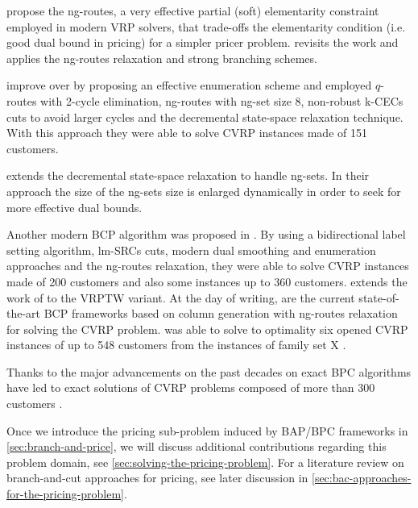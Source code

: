 \textcite{baldacci2011} propose the ng-routes, a very effective
partial (soft) elementarity constraint employed in modern VRP solvers,
that trade-offs the elementarity condition (i.e. good dual bound in pricing)
for a simpler pricer problem.
\textcite{ropke2012} revisits the work \citeauthor{fukasawa2006} and applies
the ng-routes relaxation and strong branching schemes.

\textcite{contardo2014} improve over \textcite{contardo2011}
by proposing an effective enumeration scheme and employed
$q$-routes with 2-cycle elimination, ng-routes with ng-set size 8,
non-robust k-CECs cuts to avoid larger cycles
and the decremental state-space relaxation technique.
With this approach they were able to solve CVRP instances made of 151 customers.

\textcite{martinelli2014} extends the decremental state-space relaxation
to handle ng-sets.
In their approach the size of the ng-sets size
is enlarged dynamically in order to seek for more effective dual bounds.

Another modern BCP algorithm was proposed in \textcite{pecin2017improved}.
By using a bidirectional label setting algorithm,
lm-SRCs cuts, modern dual smoothing and enumeration approaches
and the ng-routes relaxation, they were able to solve CVRP instances made of 200 customers
and also some instances up to 360 customers.
\textcite{pecin2017new} extends the work of \textcite{pecin2017improved} to the VRPTW variant.
At the day of writing, \textcite{pessoa2018enhanced, pessoa2020generic} are the current state-of-the-art
BCP frameworks based on column generation with ng-routes relaxation
for solving the CVRP problem.
\textcite{pessoa2020generic} was able to solve to optimality six opened
CVRP instances of up to 548 customers from the instances of family set X \parencite{uchoa2017}.

Thanks to the major advancements on the past decades
on exact BPC algorithms
have led to exact solutions of CVRP problems composed of
more than 300 customers \parencite{costa2019}.

Once we introduce the pricing sub-problem induced by BAP/BPC frameworks
in \cref{sec:branch-and-price},
we will discuss additional contributions regarding this problem domain,
see \cref{sec:solving-the-pricing-problem}.
For a literature review on branch-and-cut approaches for pricing, see later discussion
in \cref{sec:bac-approaches-for-the-pricing-problem}.

